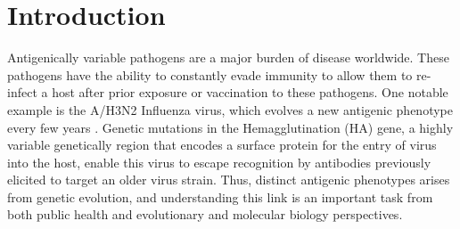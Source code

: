 \documentclass[11pt,oneside,letterpaper]{article}
\begin{document}
\begin{abstract}



\end{abstract}


\pagebreak




\section*{Introduction}


Antigenically variable pathogens are a major burden of disease worldwide. 
These pathogens have the ability to constantly evade immunity to allow them to re-infect a host after prior exposure or vaccination to these pathogens. 
One notable example is the A/H3N2 Influenza virus, which evolves a new antigenic phenotype every few years \cite{smith_mapping_2004}.
Genetic mutations in the Hemagglutination (HA) gene, a highly variable genetically region that encodes a surface protein  for the entry of virus into the host, enable this virus to escape recognition by antibodies previously elicited to target an older virus strain. 
Thus, distinct antigenic phenotypes arises from genetic evolution, and understanding this link is an important task from both public health and evolutionary and molecular biology perspectives.
\end{document}
